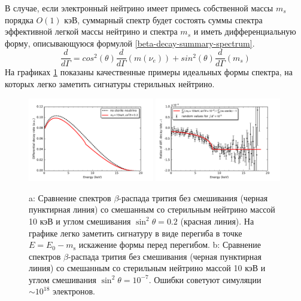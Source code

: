 \documentclass[a4paper,14pt]{extreport}
\begin{document}
В случае, если электронный нейтрино имеет примесь собственной массы $ m_s $ порядка $O(1)$ кэВ, суммарный спектр будет состоять суммы спектра эффективной легкой массы нейтрино и спектра $ m_s $ и иметь дифференциальную форму, описывающуюся формулой \ref{beta-decay-summary-spectrum}.
\begin{equation}\label{beta-decay-summary-spectrum}
    \frac{d}{d\Gamma} = cos^2(\theta) \frac{d}{d\Gamma} (m(\nu_e)) + sin^2(\theta) \frac{d}{d\Gamma} (m_s)
\end{equation}
На графиках \ref{fig:beta-decay-kink} показаны качественные примеры идеальных формы спектра, на которых легко заметить сигнатуры стерильных нейтрино.
\begin{figure}
  \centering
  \includegraphics[width = 0.49\textwidth]{img/beta_decay/PlotKink.pdf}
  \includegraphics[width = 0.49\textwidth]{img/beta_decay/PlotRatio.pdf}
  \caption{a: Сравнение спектров $\beta$-распада трития без смешивания (черная пунктирная линия) со смешанным со стерильным нейтрино массой 10 кэВ и углом смешивания $\sin^{2}\theta=0.2$ (красная линия). На графике легко заметить сигнатуру в виде перегиба в точке $E = E_0 - m_{\mathrm{s}}$ искажение формы перед перегибом. b: Сравнение спектров $\beta$-распада трития без смешивания (черная пунктирная линия) со смешанным со стерильным нейтрино массой 10 кэВ и углом смешивания  $\sin^{2}\theta=10^{-7}$. Ошибки советуют симуляции $\sim 10^{18}$ электронов.}
 \label{fig:beta-decay-kink}
\end{figure}
\end{document}
